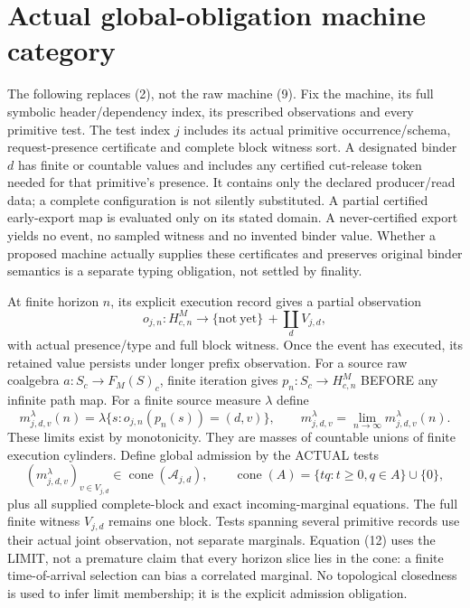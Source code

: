 \documentclass[11pt]{article}
\begin{document}
\section{Actual global-obligation machine category}
The following replaces (2), not the raw machine (9). Fix the machine, its full symbolic header/dependency index, its prescribed observations and every primitive test. The test index $j$ includes its actual primitive occurrence/schema, request-presence certificate and complete block witness sort. A designated binder $d$ has finite or countable values and includes any certified cut-release token needed for that primitive's presence. It contains only the declared producer/read data; a complete configuration is not silently substituted. A partial certified early-export map is evaluated only on its stated domain. A never-certified export yields no event, no sampled witness and no invented binder value. Whether a proposed machine actually supplies these certificates and preserves original binder semantics is a separate typing obligation, not settled by finality.

At finite horizon $n$, its explicit execution record gives a partial observation
\[
 o_{j,n}:H^M_{c,n}\longrightarrow
       \{\mathrm{not\ yet}\}\,+\!\coprod_d V_{j,d},       \tag{10}
\]
with actual presence/type and full block witness. Once the event has executed, its retained value persists under longer prefix observation. For a source raw coalgebra $a:S_c\to F_M(S)_c$, finite iteration gives $p_n:S_c\to H^M_{c,n}$ BEFORE any infinite path map. For a finite source measure $\lambda$ define
\[
 m^{\lambda}_{j,d,v}(n)=
 \lambda\{s:o_{j,n}(p_n(s))=(d,v)\},\qquad
 m^{\lambda}_{j,d,v}=\lim_{n\to\infty}m^{\lambda}_{j,d,v}(n). \tag{11}
\]
These limits exist by monotonicity. They are masses of countable unions of finite execution cylinders. Define global admission by the ACTUAL tests
\[
 (m^{\lambda}_{j,d,v})_{v\in V_{j,d}}\in
       \operatorname{cone}(\mathcal A_{j,d}),\qquad
 \operatorname{cone}(A)=\{tq:t\ge0,q\in A\}\cup\{0\},  \tag{12}
\]
plus all supplied complete-block and exact incoming-marginal equations. The full finite witness $V_{j,d}$ remains one block. Tests spanning several primitive records use their actual joint observation, not separate marginals. Equation (12) uses the LIMIT, not a premature claim that every horizon slice lies in the cone: a finite time-of-arrival selection can bias a correlated marginal. No topological closedness is used to infer limit membership; it is the explicit admission obligation.
\end{document}
